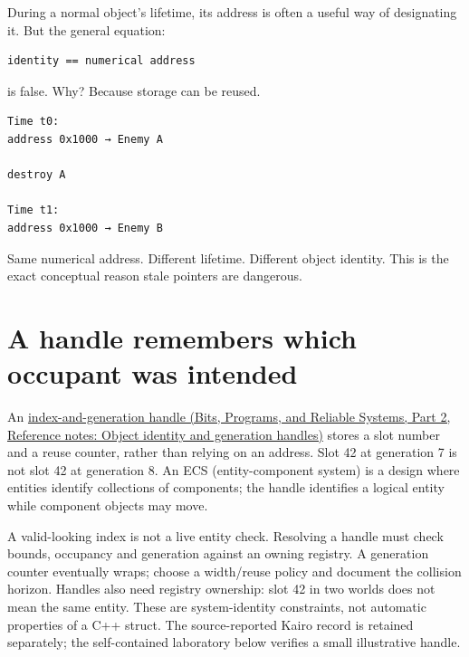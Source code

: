 \hypertarget{05-engine-i-ch002-address-is-often-useful-as-identity-but-is-not-identity-itself}{}

During a normal object's lifetime, its address is often a useful way of designating it. But the general equation:

\begin{verbatim}
identity == numerical address
\end{verbatim}

is false. Why? Because storage can be reused.

\begin{verbatim}
Time t0:
address 0x1000 → Enemy A

destroy A

Time t1:
address 0x1000 → Enemy B
\end{verbatim}

Same numerical address. Different lifetime. Different object identity. This is the exact conceptual reason stale pointers are dangerous.

\section{A handle remembers which occupant was intended}\label{05-engine-i-ch002-a-handle-remembers-which-occupant-was-intended}

\hypertarget{05-engine-i-ch002-a-handle-remembers-which-occupant-was-intended}{}

An \href{../01-Bits-Programs-and-Reliable-Systems-P02/main.pdf\#appendix-f1581457d322}{index-and-generation handle (Bits, Programs, and Reliable Systems, Part 2, Reference notes: Object identity and generation handles)} stores a slot number and a reuse counter, rather than relying on an address. Slot 42 at generation 7 is not slot 42 at generation 8. An ECS (entity-component system) is a design where entities identify collections of components; the handle identifies a logical entity while component objects may move.

A valid-looking index is not a live entity check. Resolving a handle must check bounds, occupancy and generation against an owning registry. A generation counter eventually wraps; choose a width/reuse policy and document the collision horizon. Handles also need registry ownership: slot 42 in two worlds does not mean the same entity. These are system-identity constraints, not automatic properties of a C++ struct. The source-reported Kairo record is retained separately; the self-contained laboratory below verifies a small illustrative handle.

